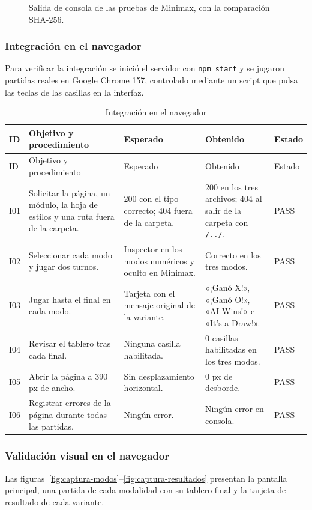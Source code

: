 \documentclass[12pt,a4paper]{article}
\begin{document}
\begin{figure}[H]

\caption{Salida de consola de las pruebas de Minimax, con la comparación SHA-256.}
\label{fig:consola-minimax}
\end{figure}

\subsubsection{Integración en el navegador}
Para verificar la integración se inició el servidor con \texttt{npm start} y se
jugaron partidas reales en Google Chrome 157, controlado mediante un script que
pulsa las teclas de las casillas en la interfaz.
\begin{longtable}{p{1cm}p{3.4cm}p{3.3cm}p{3.4cm}p{1.6cm}}
\caption{Integración en el navegador}\\
\toprule ID & Objetivo y procedimiento & Esperado & Obtenido & Estado\\\midrule\endfirsthead
\toprule ID & Objetivo y procedimiento & Esperado & Obtenido & Estado\\\midrule\endhead
I01 & Solicitar la página, un módulo, la hoja de estilos y una ruta fuera de la carpeta. & 200 con el tipo correcto; 404 fuera de la carpeta. & 200 en los tres archivos; 404 al salir de la carpeta con \texttt{/../}. & PASS\\
I02 & Seleccionar cada modo y jugar dos turnos. & Inspector en los modos numéricos y oculto en Minimax. & Correcto en los tres modos. & PASS\\
I03 & Jugar hasta el final en cada modo. & Tarjeta con el mensaje original de la variante. & «¡Ganó X!», «¡Ganó O!», «AI Wins!» e «It's a Draw!». & PASS\\
I04 & Revisar el tablero tras cada final. & Ninguna casilla habilitada. & 0 casillas habilitadas en los tres modos. & PASS\\
I05 & Abrir la página a 390 px de ancho. & Sin desplazamiento horizontal. & 0 px de desborde. & PASS\\
I06 & Registrar errores de la página durante todas las partidas. & Ningún error. & Ningún error en consola. & PASS\\
\bottomrule
\end{longtable}

\subsubsection{Validación visual en el navegador}
Las figuras~\ref{fig:captura-modos}--\ref{fig:captura-resultados} presentan la
pantalla principal, una partida de cada modalidad con su tablero final y la
tarjeta de resultado de cada variante.
\end{document}
